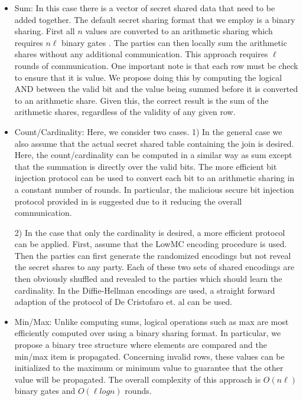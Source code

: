 \begin{itemize}
	\item Sum: In this case there is a vector of secret shared data that need to be added together.  The default secret sharing format that we employ is a binary sharing. First all $n$ values are converted to an arithmetic sharing which requires $n\ell$ binary gates \cite{aby3}. The parties can then locally sum the arithmetic shares without any additional communication. This approach requires $\ell$ rounds of communication. One important note is that each row must be check to ensure that it is value. We propose doing this by computing the logical AND between the valid bit and the value being summed before it is converted to an arithmetic share. Given this, the correct result is the sum of the arithmetic shares, regardless of the validity of any given row.
	
	\item Count/Cardinality: Here, we consider two cases. 1) In the general case we also assume that the actual secret shared table containing the join is desired. Here, the count/cardinality can be computed in a similar way as sum except that the summation is directly over the valid bits. The more efficient bit injection protocol\cite{aby3} can be used to convert each bit to an arithmetic sharing in a constant number of rounds. In particular, the malicious secure bit injection protocol provided in \cite{aby3} is suggested due to it reducing the overall communication. 
	
	2) In the case that only the cardinality is desired, a more efficient protocol can be applied. First, assume that the LowMC encoding procedure is used. Then the parties can first generate the randomized encodings but not reveal the secret shares to any party. Each of these two sets of shared encodings are then obviously shuffled and revealed to the parties which should learn the cardinality. In the Diffie-Hellman encodings are used, a straight forward adaption of the protocol of De Cristofaro  et. al \cite{DBLP:conf/cans/CristofaroGT12} can be used.
	
	\item  Min/Max: Unlike computing sums, logical operations such as max are most efficiently computed over using a binary sharing format. In particular, we propose a binary tree structure where elements are compared and the min/max item is propagated. Concerning invalid rows, these values can be initialized to the maximum or minimum value to guarantee that the other value will be propagated. The overall complexity of this approach is $O(n\ell)$ binary gates and $O(\ell log n)$ rounds.
\end{itemize}

